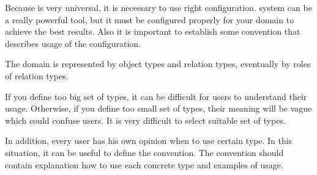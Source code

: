 
Because \textan{} is very universal, it is necessary to use right configuration.
\textan{} system can be a really powerful tool, but it must be configured properly
for your domain to achieve the best results. Also it is important to establish
some convention that describes usage of the configuration.

The domain is represented by object types and relation types, eventually by roles
of relation types. 

If you define too big set of types, it can be difficult for users to understand
their usage. Otherwise, if you define too small set of types, their meaning will
be vague which could confuse users. It is very difficult to select suitable set
of types.

In addition, every user has his own opinion when to use certain type. In this
situation, it can be useful to define the convention. The convention should contain
explanation how to use each concrete type and examples of usage.
